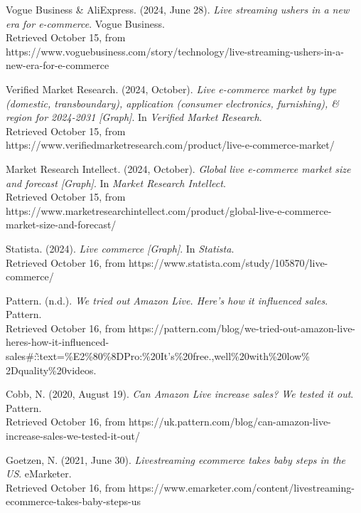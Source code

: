 \documentclass[12pt]{ctexart}
\begin{document}
\newpage
{}
\begin{thebibliography}{99}

     Vogue Business \& AliExpress. (2024, June 28). \textit{Live streaming ushers in a new era for e-commerce}. Vogue Business. \\ Retrieved October 15, from https://www.voguebusiness.com/story/technology/live-streaming-ushers-in-a-new-era-for-e-commerce

     Verified Market Research. (2024, October). \textit{Live e-commerce market by type (domestic, transboundary), application (consumer electronics, furnishing), \& region for 2024-2031 [Graph]}. In \textit{Verified Market Research}. \\ Retrieved October 15, from https://www.verifiedmarketresearch.com/product/live-e-commerce-market/

     Market Research Intellect. (2024, October). \textit{Global live e-commerce market size and forecast [Graph]}. In \textit{Market Research Intellect}. \\ Retrieved October 15, from https://www.marketresearchintellect.com/product/global-live-e-commerce-market-size-and-forecast/

     Statista. (2024). \textit{Live commerce [Graph]}.  In \textit{Statista}. \\ Retrieved October 16, from  https://www.statista.com/study/105870/live-commerce/ 

     Pattern. (n.d.). \textit{We tried out Amazon Live. Here's how it influenced sales}. Pattern.  \\ Retrieved October 16, from https://pattern.com/blog/we-tried-out-amazon-live-heres-how-it-influenced-sales\#:\~:text=\%E2\%80\%8DPro:\%20It's\%20free.,well\%20with\%20low\%\\2Dquality\%20videos.

     Cobb, N. (2020, August 19). \textit{Can Amazon Live increase sales? We tested it out}. Pattern.  \\ Retrieved October 16, from https://uk.pattern.com/blog/can-amazon-live-increase-sales-we-tested-it-out/

     Goetzen, N. (2021, June 30). \textit{Livestreaming ecommerce takes baby steps in the US}. eMarketer. \\ Retrieved October 16, from https://www.emarketer.com/content/livestreaming-ecommerce-takes-baby-steps-us


\end{thebibliography}
\end{document}
